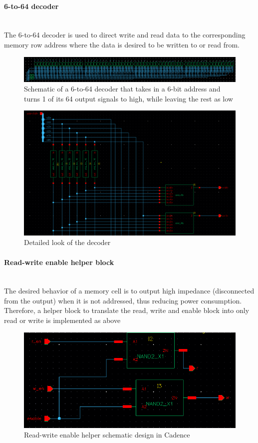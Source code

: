 \documentclass[letterpaper, 11pt]{article}
\newcommand{\subsubsubsection}[1]{\paragraph{#1}\mbox{}\\}
\begin{document}
	\subsubsubsection{6-to-64 decoder}
	The 6-to-64 decoder is used to direct write and read data to the corresponding memory row address where the data is desired to be written to or read from.
	
	\begin{figure}[htb!]
		\centering
		\includegraphics[width=0.85\linewidth]{report_pics/6x64_decoder_schem.png}
		\caption{Schematic of a 6-to-64 decoder that takes in a 6-bit address and turns 1 of its 64 output signals to high, while leaving the rest as low}
		\label{fig17}
	\end{figure}
	
	\begin{figure}[htb!]
		\centering
		\includegraphics[width=0.85\linewidth]{report_pics/6x64_decoder_detailed.png}
		\caption{Detailed look of the decoder}
		\label{fig18}
	\end{figure}
	
	\subsubsubsection{Read-write enable helper block}
	The desired behavior of a memory cell is to output high impedance (disconnected from the output) when it is not addressed, thus reducing power consumption. Therefore, a helper block to translate the read, write and enable block into only read or write is implemented as above
	
	\begin{figure}[htb!]
		\centering
		\includegraphics[width=0.85\linewidth]{report_pics/rw_en_helper_schem.png}
		\caption{Read-write enable helper schematic design in Cadence}
		\label{fig19}
	\end{figure}
	
\end{document}

